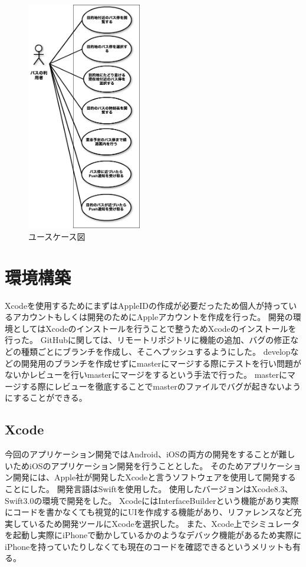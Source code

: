 \documentclass[openany,11pt,papersize]{jsbook}
\begin{document}
\begin{figure}[htbp]
  \begin{center}
    \includegraphics[clip,width=5.0cm]{img/usecase.png}
    \caption{ユースケース図}
    \label{fig:usecase}
  \end{center}
\end{figure}


\section{環境構築}
Xcodeを使用するためにまずはAppleIDの作成が必要だったため個人が持っているアカウントもしくは開発のためにAppleアカウントを作成を行った。
開発の環境としてはXcodeのインストールを行うことで整うためXcodeのインストールを行った。
GitHubに関しては、リモートリポジトリに機能の追加、バグの修正などの種類ごとにブランチを作成し、そこへプッシュするようにした。
developなどの開発用のブランチを作成せずにmasterにマージする際にテストを行い問題がないかレビューを行いmasterにマージをするという手法で行った。
masterにマージする際にレビューを徹底することでmasterのファイルでバグが起きないようにすることができる。

\subsection{Xcode}
今回のアプリケーション開発ではAndroid、iOSの両方の開発をすることが難しいためiOSのアプリケーション開発を行うこととした。
そのためアプリケーション開発には、Apple社が開発したXcodeと言うソフトウェアを使用して開発することにした。
開発言語はSwiftを使用した。
使用したバージョンはXcode8.3、Swift3.0の環境で開発をした。
XcodeにはInterfaceBuilderという機能があり実際にコードを書かなくても視覚的にUIを作成する機能があり、リファレンスなど充実しているため開発ツールにXcodeを選択した。
また、Xcode上でシミュレータを起動し実際にiPhoneで動かしているかのようなデバック機能があるため実際にiPhoneを持っていたりしなくても現在のコードを確認できるというメリットも有る。
\end{document}

